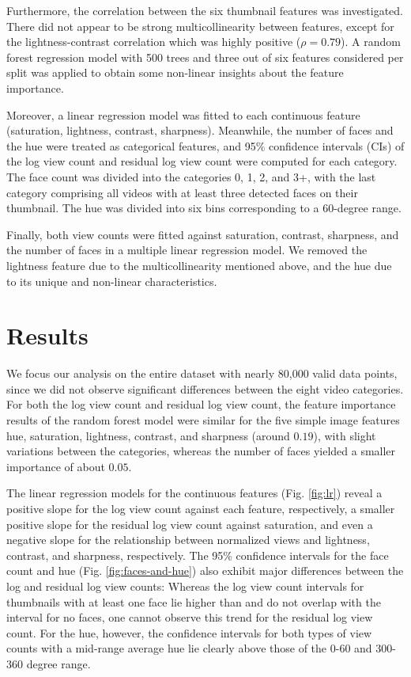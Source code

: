 \documentclass{article}
\begin{document}
Furthermore, the correlation between the six thumbnail features was investigated. There did not appear to be strong multicollinearity between features, except for the lightness-contrast correlation which was highly positive ($\rho=0.79$). A random forest regression model with 500 trees and three out of six features considered per split was applied to obtain some non-linear insights about the feature importance.

Moreover, a linear regression model was fitted to each continuous feature (saturation, lightness, contrast, sharpness). Meanwhile, the number of faces and the hue were treated as categorical features, and 95\% confidence intervals (CIs) of the log view count and residual log view count were computed for each category. The face count was divided into the categories 0, 1, 2, and 3+, with the last category comprising all videos with at least three detected faces on their thumbnail. The hue was divided into six bins corresponding to a 60-degree range.

Finally, both view counts were fitted against saturation, contrast, sharpness, and the number of faces in a multiple linear regression model. We removed the lightness feature due to the multicollinearity mentioned above, and the hue due to its unique and non-linear characteristics.

\section{Results}
We focus our analysis on the entire dataset with nearly 80,000 valid data points, since we did not observe significant differences between the eight video categories. For both the log view count and residual log view count, the feature importance results of the random forest model were similar for the five simple image features hue, saturation, lightness, contrast, and sharpness (around $0.19$), with slight variations between the categories, whereas the number of faces yielded a smaller importance of about $0.05$.

The linear regression models for the continuous features (Fig. \ref{fig:lr}) reveal a positive slope for the log view count against each feature, respectively, a smaller positive slope for the residual log view count against saturation, and even a negative slope for the relationship between normalized views and lightness, contrast, and sharpness, respectively. The 95\% confidence intervals for the face count and hue (Fig. \ref{fig:faces-and-hue}) also exhibit major differences between the log and residual log view counts: Whereas the log view count intervals for thumbnails with at least one face lie higher than and do not overlap with the interval for no faces, one cannot observe this trend for the residual log view count. For the hue, however, the confidence intervals for both types of view counts with a mid-range average hue lie clearly above those of the 0-60 and 300-360 degree range.
\end{document}
